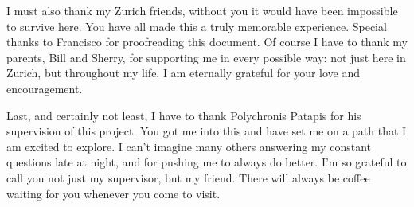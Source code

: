 I must also thank my Zurich friends, without you it would have been impossible to survive here.
You have all made this a truly memorable experience.
Special thanks to Francisco for proofreading this document.
Of course I have to thank my parents, Bill and Sherry, for supporting me in every possible way: not just here in Zurich, but throughout my life. 
I am eternally grateful for your love and encouragement.

Last, and certainly not least, I have to thank Polychronis Patapis for his supervision of this project. 
You got me into this and have set me on a path that I am excited to explore.
I can't imagine many others answering my constant questions late at night, and for pushing me to always do better. 
I'm so grateful to call you not just my supervisor, but my friend. 
There will always be coffee waiting for you whenever you come to visit.

\bigskip
\bigskip
